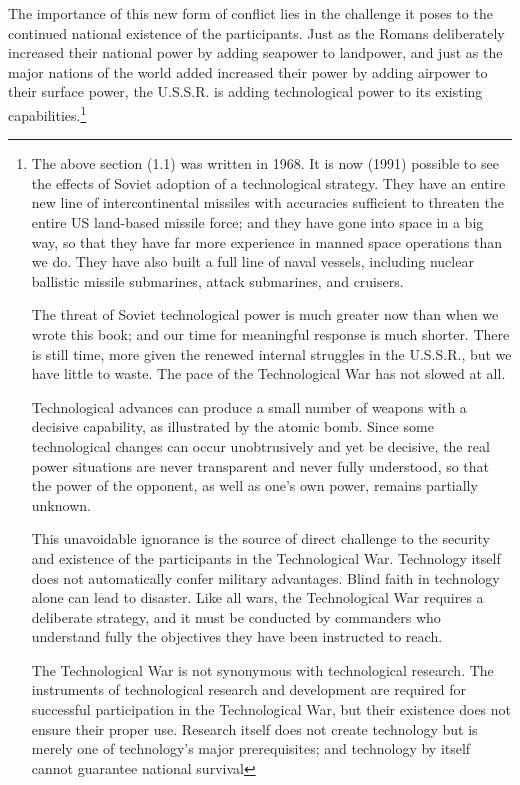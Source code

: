 \documentclass[a4paper,12pt]{book}
\begin{document}
The importance of this new form of conflict lies in the challenge it poses to the continued national existence of the participants. Just as the Romans deliberately increased their national power by adding seapower to landpower, and just as the major nations of the world added increased their power by adding airpower to their surface power, the U.S.S.R. is adding technological power to its existing capabilities.\footnote{
The above section (1.1) was written in 1968. It is now (1991) possible to see the effects of Soviet adoption of a technological strategy. They have an entire new line of intercontinental missiles with accuracies sufficient to threaten the entire US land-based missile force; and they have gone into space in a big way, so that they have far more experience in manned space operations than we do.
They have also built a full line of naval vessels, including nuclear ballistic missile submarines, attack submarines, and cruisers.

The threat of Soviet technological power is much greater now than when we wrote this book; and our time for meaningful response is much shorter. There is still time, more given the renewed internal struggles in the U.S.S.R., but we have little to waste. The pace of the Technological War has not slowed at all.

Technological advances can produce a small number of weapons with a decisive capability, as illustrated by the atomic bomb. Since some technological changes can occur unobtrusively and yet be decisive, the real power situations are never transparent and never fully understood, so that the power of the opponent, as well as one's own power, remains partially unknown.

This unavoidable ignorance is the source of direct challenge to the security and existence of the participants in the Technological War. Technology itself does not automatically confer military advantages. Blind faith in technology alone can lead to disaster. Like all wars, the Technological War requires a deliberate strategy, and it must be conducted by commanders who understand fully the objectives they have been instructed to reach.

The Technological War is not synonymous with technological research. The instruments of technological research and development are required for successful participation in the Technological War, but their existence does not ensure their proper use. Research itself does not create technology but is merely one of technology's major prerequisites; and technology by itself cannot guarantee national survival
}
\end{document}
